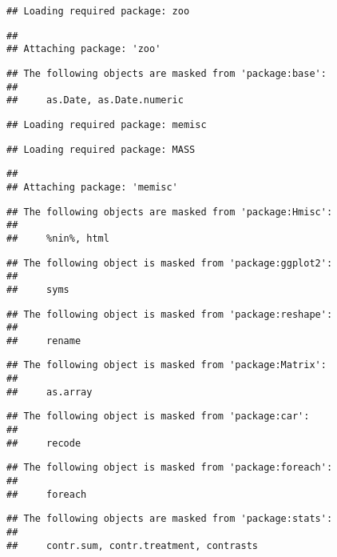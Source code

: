 \documentclass[11pt,]{article}
\begin{document}
\begin{verbatim}
## Loading required package: zoo
\end{verbatim}

\begin{verbatim}
## 
## Attaching package: 'zoo'
\end{verbatim}

\begin{verbatim}
## The following objects are masked from 'package:base':
## 
##     as.Date, as.Date.numeric
\end{verbatim}

\begin{verbatim}
## Loading required package: memisc
\end{verbatim}

\begin{verbatim}
## Loading required package: MASS
\end{verbatim}

\begin{verbatim}
## 
## Attaching package: 'memisc'
\end{verbatim}

\begin{verbatim}
## The following objects are masked from 'package:Hmisc':
## 
##     %nin%, html
\end{verbatim}

\begin{verbatim}
## The following object is masked from 'package:ggplot2':
## 
##     syms
\end{verbatim}

\begin{verbatim}
## The following object is masked from 'package:reshape':
## 
##     rename
\end{verbatim}

\begin{verbatim}
## The following object is masked from 'package:Matrix':
## 
##     as.array
\end{verbatim}

\begin{verbatim}
## The following object is masked from 'package:car':
## 
##     recode
\end{verbatim}

\begin{verbatim}
## The following object is masked from 'package:foreach':
## 
##     foreach
\end{verbatim}

\begin{verbatim}
## The following objects are masked from 'package:stats':
## 
##     contr.sum, contr.treatment, contrasts
\end{verbatim}
\end{document}
